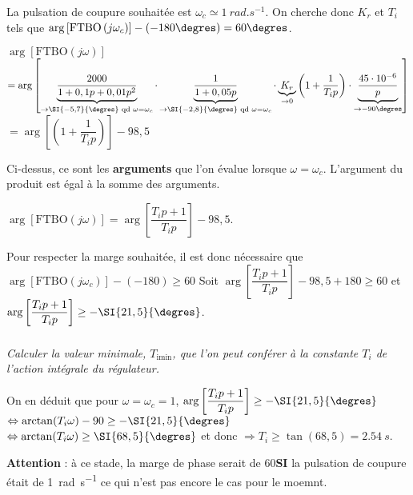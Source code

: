 \begin{multicols}{2}
\normalsize 

\ifprof
\begin{corrige}
La pulsation de coupure souhaitée est $\omega_c \simeq \SI{1}{rad.s^{-1}}$. 
On cherche donc $K_r$ et $T_i$ tels que $\arg \left[\text{FTBO}\left( j \omega_c\right)\right]-\left(-180\degres\right)=60\degres$.

$\arg \left[\text{FTBO}\left( j \omega\right)\right]$ 
$ = \arg \left[
\underbrace{\dfrac{2000}{1+0,1p+0,01p^2}}_{\to \SI{-5,7}{\degres} \text{ qd } \omega=\omega_c} 
\cdot
\underbrace{\dfrac{1}{1+0,05p}}_{\to \SI{-2,8}{\degres} \text{ qd } \omega=\omega_c} 
\cdot 
 \underbrace{K_r}_{\to 0}
 \left(1+\dfrac{1}{T_i p} \right) \cdot 
\underbrace{\dfrac{45\cdot 10^{-6}}{p}}_{\to -90\degres } 
\right] $
$ = \arg \left[  \left(1+\dfrac{1}{T_i p} \right) \right] -98,5$

\begin{rem}
Ci-dessus, ce sont les \textbf{arguments} que l'on évalue lorsque $\omega=\omega_c$. L'argument du produit est égal à la somme des arguments.
\end{rem}
$ \arg \left[\text{FTBO}\left( j \omega\right)\right] = \arg \left[  \dfrac{T_i p+1}{T_i p}  \right]-98,5 $.

Pour respecter la marge souhaitée, il est donc nécessaire que 
$\arg \left[\text{FTBO}\left( j \omega_c\right)\right]-\left(-180\right)\geq60$
Soit 
$\arg \left[  \dfrac{T_i p+1}{T_i p}  \right]-98,5+ 180 \geq60$ 
et $\arg \left[  \dfrac{T_i p+1}{T_i p}  \right] \geq - \SI{21,5}{\degres}$.
 
\end{corrige}
\else
\fi

\subparagraph{}\textit{Calculer la valeur minimale, $T_{\text{imin}}$, que l’on peut conférer à la constante $T_i$ de l’action intégrale du régulateur.}

\ifprof
\begin{corrige}
On en déduit que pour $\omega=\omega_c=1$, 
$\arg \left[  \dfrac{T_i p+1}{T_i p}  \right] \geq - \SI{21,5}{\degres}$
$ \Leftrightarrow  \arctan (T_i \omega) -90 \geq - \SI{21,5}{\degres}$ 
$ \Leftrightarrow  \arctan (T_i \omega)  \geq \SI{68,5}{\degres}$ 
et donc $\Rightarrow  T_i \geq \tan(68,5)=\SI{2,54}{s}$.
 

 \begin{warn}
\textbf{Attention} : à ce stade, la marge de phase serait de 60\degres \textbf{SI} la pulsation de  coupure était de \SI{1}{rad.s^{-1}} ce qui n'est pas encore le cas pour le moemnt.
 \end{warn}
 

\end{corrige}
\end{multicols}
